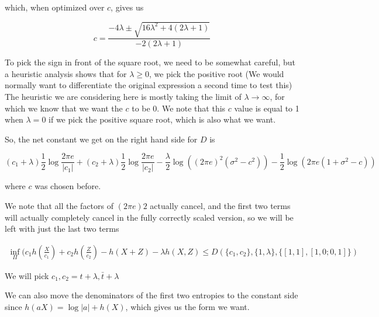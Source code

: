 \documentclass[12pt, letterpaper]{article}
\begin{document}
which, when optimized over $c$, gives us 

\[ c = \frac{-4 \lambda \pm \sqrt{16 \lambda^2 + 4(2\lambda + 1)} }{-2(2\lambda + 1)} \]

To pick the sign in front of the square root, we need to be somewhat careful, but a heuristic analysis shows that for $\lambda \geq 0$, we pick the positive root (We would normally want to differentiate the original expression a second time to test this) The heuristic we are considering here is mostly taking the limit of $\lambda \rightarrow \infty$, for which we know that we want the $c$ to be 0. We note that this $c$ value is equal to 1 when $\lambda = 0$ if we pick the positive square root, which is also what we want.

So, the net constant we get on the right hand side for $D$ is  

\[ (c_1 + \lambda) \frac{1}{2} \log \frac{2 \pi e}{|c_1|} +   (c_2 + \lambda) \frac{1}{2} \log \frac{2 \pi e}{|c_2|} -  \frac{\lambda}{2} \log ((2 \pi e)^2 (\sigma^2 - c^2)) - \frac{1}{2} \log (2 \pi e (1 + \sigma^2 - c)) \] 

where $c$ was chosen before.

We note that all the factors of $(2 \pi e)2$ actually cancel, and the first two terms will actually completely cancel in the fully correctly scaled version, so we will be left with just the last two terms

\begin{align*}
	\inf_\Pi (c_1  h(\frac{X}{c_1}) + c_2  h(\frac{Z}{c_2}) - h(X + Z) - \lambda h(X, Z) \leq D(\{c_1, c_2\}, \{1, \lambda \}, \{ [1 ,1], [1, 0; 0 ,1] \} )	
\end{align*}

We will pick $c_1, c_2 = t + \lambda, \bar{t} + \lambda$

We can also move the denominators of the first two entropies to the constant side since $h(aX) = \log |a| + h(X)$, which gives us the form we want. 
\end{document}
